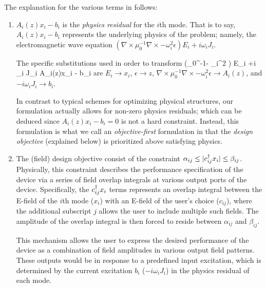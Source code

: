\documentclass[letterpaper,10pt]{article}
\begin{document}
The explanation for the various terms in  follows:
\begin{enumerate}
\item 
    $A_i(z)x_i - b_i$ is the \emph{physics residual} for the $i$th mode.
    That is to say, $A_i(z)x_i - b_i$ represents the underlying physics
        of the problem; namely, the electromagnetic wave equation
        \mbox{$(\nabla\times\mu_0^{-1}\nabla\times - \omega_i^2 \epsilon) E_i 
            +i \omega_i J_i $}.

    The specific substitutions used in order to transform
        \BE (\nabla\times\mu_0^{-1}\nabla\times - \omega_i^2 \epsilon) E_i 
            +i \omega_i J_i  \quad\longrightarrow\quad A_i(z)x_i - b_i \EE
        are
    \BI $E_i \to x_i$,
    \I  $\epsilon \to z$,
    \I  $\nabla\times\mu_0^{-1}\nabla\times - \omega_i^2 \epsilon \to A_i(z)$, and
    \I  $ -i\omega_i J_i \to b_i$.  \EI

    In contrast to typical schemes for optimizing physical structures,
        our formulation actually allows for non-zero physics residuals;
        which can be deduced since $A_i(z)x_i-b_i=0$ is not a hard constraint.
    Instead, this formulation is what we call an \emph{objective-first} \cite{ob1_wg}
        formulation in that the \emph{design objective} (explained below)
        is prioritized above satisfying physics.

\item
    The (field) design objective consist of 
        the constraint $\alpha_{ij} \le |c_{ij}^\dagger x_i| \le \beta_{ij}$.
    Physically, this constraint describes 
        the performance specification of the device 
        via a series of field overlap integrals 
        at various output ports of the device.
    Specifically, the $c_{ij}^\dagger x_i$ terms represents an overlap integral between
        the E-field of the $i$th mode ($x_i$)
        with an E-field of the user's choice ($c_{ij}$),
        where the additional subscript $j$ allows the user
        to include multiple such fields.
    The amplitude of the overlap integral is then forced to reside between
        $\alpha_{ij}$ and $\beta_{ij}$.

    This mechanism allows the user to express 
        the desired performance of the device
        as a combination of field amplitudes in various output field patterns.
    These outputs would be in response to a predefined input excitation,
        which is determined by the current excitation $b_i$ ($-i\omega_i J_i$)
        in the physics residual of each mode.


\end{enumerate}
\end{document}
